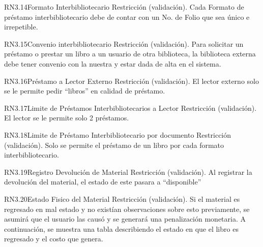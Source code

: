 \begin{BussinesRule}{RN3.14}{Formato Interbibliotecario} 
	\BRitem[Tipo:] Restricción (validación).
	\BRitem[Descripción:]Cada Formato de préstamo interbibliotecario debe de contar con un No. de Folio que sea único e irrepetible.
\end{BussinesRule}

\begin{BussinesRule}{RN3.15}{Convenio interbibliotecario} 
	\BRitem[Tipo:] Restricción (validación).
	\BRitem[Descripción:]Para solicitar un préstamo o prestar un libro a un usuario de otra biblioteca, la biblioteca externa debe tener convenio con la nuestra y estar dada de alta en el sistema. 
\end{BussinesRule}

\begin{BussinesRule}{RN3.16}{Préstamo a Lector Externo} 
	\BRitem[Tipo:] Restricción (validación).
	\BRitem[Descripción:]El lector externo solo se le permite pedir “libros” en calidad de préstamo.
\end{BussinesRule}

\begin{BussinesRule}{RN3.17}{Limite de Préstamos Interbibliotecarios a Lector } 
	\BRitem[Tipo:] Restricción (validación).
	\BRitem[Descripción:]El lector se le permite solo 2 préstamos.
\end{BussinesRule}

\begin{BussinesRule}{RN3.18}{Limite de Préstamo Interbibliotecario por documento} 
	\BRitem[Tipo:] Restricción (validación).
	\BRitem[Descripción:]Solo se permite el préstamo de un libro por cada formato interbibliotecario.
\end{BussinesRule}

\begin{BussinesRule}{RN3.19}{Registro Devolución de Material } 
	\BRitem[Tipo:] Restricción (validación).
	\BRitem[Descripción:]Al registrar la devolución del material, el estado de este pasara a “disponible”
\end{BussinesRule}

\begin{BussinesRule}{RN3.20}{Estado Fisico del Material} 
	\BRitem[Tipo:] Restricción (validación).
	\BRitem[Descripción:]Si el material es regresado en mal estado y no existían observaciones sobre esto previamente, se asumirá que el usuario las causó y se generará una penalización monetaria. A continuación, se muestra una tabla describiendo el estado en que el libro es regresado y el costo que genera.
\end{BussinesRule}

